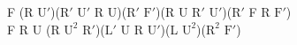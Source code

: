 F (R $\text{U}'$)($\text{R}'$ $\text{U}'$ R U)($\text{R}'$ $\text{F}'$)(R U $\text{R}'$ $\text{U}'$)($\text{R}'$ F R $\text{F}'$)\\
F R U (R $\text{U}^2$ $\text{R}'$)($\text{L}'$ U R $\text{U}'$)(L $\text{U}^2$)($\text{R}^2$ $\text{F}'$)\\
